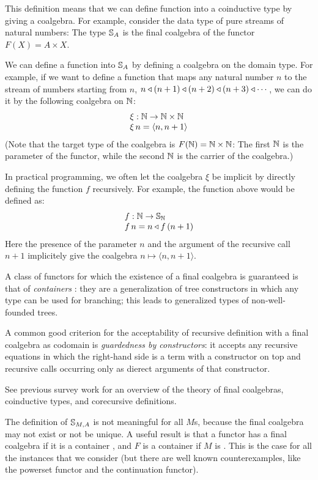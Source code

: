 \documentclass{article}
\begin{document}
This definition means that we can define function into a coinductive type by giving a coalgebra.
For example, consider the data type of pure streams of natural numbers:
The type $\mathbb{S}_{A}$ is the final coalgebra of the functor $F(X) = A\times X$.

We can define a function into $\mathbb{S}_{A}$ by defining a coalgebra on the domain type.
For example, if we want to define a function that maps any natural number $n$ to the stream of numbers starting from $n$, $n\triangleleft (n+1) \triangleleft (n+2) \triangleleft (n+3) \triangleleft \cdots$, we can do it by the following coalgebra on $\mathbb{N}$:
$$
\begin{array}{l}
\xi : \mathbb{N} \rightarrow \mathbb{N}\times \mathbb{N}\\
\xi\,n = \langle n,n+1\rangle
\end{array}
$$
(Note that the target type of the coalgebra is $F(\mathbb{N}) = \mathbb{N}\times\mathbb{N}$: The first $\mathbb{N}$ is the parameter of the functor, while the second $\mathbb{N}$ is the carrier of the coalgebra.)

In practical programming, we often let the coalgebra $\xi$ be implicit by directly defining the function $f$ recursively.
For example, the function above would be defined as:
$$
\begin{array}{l}
f: \mathbb{N} \rightarrow \mathbb{S}_{\mathbb{N}}\\
f\,n = n \triangleleft f\,(n+1)
\end{array}
$$
Here the presence of the parameter $n$ and the argument of the recursive call $n+1$ implicitely give the coalgebra $n \mapsto \langle n, n+1\rangle$.

A class of functors for which the existence of a final coalgebra is guaranteed is that of {\em containers} \cite{AAG:2005}: they are a generalization of tree constructors in which any type can be used for branching; this leads to generalized types of non-well-founded trees.

A common good criterion for the acceptability of recursive definition with a final coalgebra as codomain is {\em guardedness by constructors}: it accepts any recursive equations in which the right-hand side is a term with a constructor on top and recursive calls occurring only as dierect arguments of that constructor.

See previous survey work \cite{capretta:2011} for an overview of the theory of final coalgebras, coinductive types, and corecursive definitions.

The definition of $\mathbb{S}_{M,A}$ is not meaningful for all $M$s, because the final coalgebra may not exist or not be unique.
A useful result is that a functor has a final coalgebra if it is a container \cite{AAG:2005}, and $F$ is a container if $M$ is \cite{capretta/fowler:2017}.
This is the case for all the instances that we consider (but there are well known counterexamples, like the powerset functor and the continuation functor).
\end{document}
